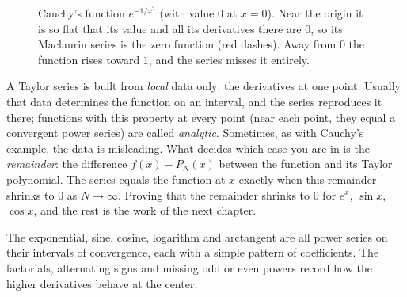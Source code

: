 \begin{figure}[htbp]
\centering
{}
\caption{Cauchy's function $e^{-1/x^2}$ (with value $0$ at $x=0$). Near the origin it is so flat that its value and all its derivatives there are $0$, so its Maclaurin series is the zero function (red dashes). Away from $0$ the function rises toward $1$, and the series misses it entirely.}
\label{ch30:fig-cauchy}
\end{figure}

\begin{intuitionbox}
A Taylor series is built from \emph{local} data only: the derivatives at one point. Usually that data determines the function on an interval, and the series reproduces it there; functions with this property at every point (near each point, they equal a convergent power series) are called \emph{analytic}. Sometimes, as with Cauchy's example, the data is misleading. What decides which case you are in is the \emph{remainder}: the difference $f(x) - P_N(x)$ between the function and its Taylor polynomial. The series equals the function at $x$ exactly when this remainder shrinks to $0$ as $N\to\infty$. Proving that the remainder shrinks to $0$ for $e^x$, $\sin x$, $\cos x$, and the rest is the work of the next chapter.
\end{intuitionbox}

\begin{aestheticbox}
The exponential, sine, cosine, logarithm and arctangent are all power series on their intervals of convergence, each with a simple pattern of coefficients. The factorials, alternating signs and missing odd or even powers record how the higher derivatives behave at the center.
\end{aestheticbox}


